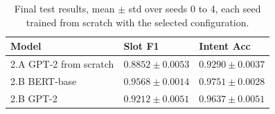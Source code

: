 \documentclass[a4paper]{article}
\begin{document}
\begin{table}[t]
  \centering
  \caption{Final test results, mean $\pm$ std over seeds 0 to 4, each seed trained from scratch with the selected configuration.}
  \label{tab:final}
  \footnotesize
  \begin{tabular}{@{}lll@{}}
    \toprule
    Model & Slot F1 & Intent Acc \\
    \midrule
    2.A GPT-2 from scratch & $0.8852 \pm 0.0053$ & $0.9290 \pm 0.0037$ \\
    2.B BERT-base          & $\mathbf{0.9568 \pm 0.0014}$ & $\mathbf{0.9751 \pm 0.0028}$ \\
    2.B GPT-2              & $0.9212 \pm 0.0051$ & $0.9637 \pm 0.0051$ \\
    \bottomrule
  \end{tabular}
\end{table}
\end{document}
